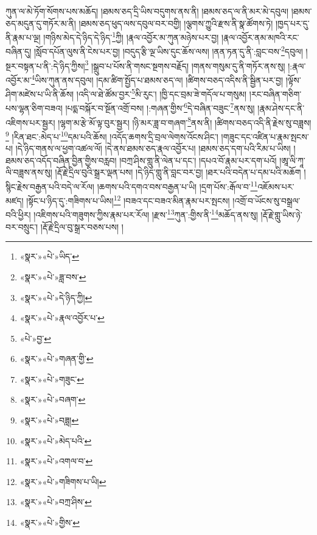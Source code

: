 ཀུན་ལ་མེ་ཏོག་སོགས་པས་མཆོད། །ཐམས་ཅད་དྲི་ཡིས་བདུགས་ནས་ནི། །ཐམས་ཅད་ལ་ནི་མར་མེ་དབུལ། །ཐམས་ཅད་མདུན་དུ་གཏོར་མ་ནི། །ཐམས་ཅད་ཕུད་ལས་དབུལ་བར་བགྱི། །ལྕགས་ཀྱུའི་རྫས་ནི་སྣ་ཚོགས་ཏེ། །ཁྱད་པར་དུ་ནི་རྣམ་པ་ལྔ། །གཉིས་མེད་དེ་ཉིད་དེ་ཉིད་\footnote{«སྣར་»«པེ་»ཡིད་}ཀྱི། །རྣལ་འབྱོར་མ་ཀུན་མཉེས་པར་བྱ། །རྣལ་འབྱོར་ནམ་མཁའི་རང་བཞིན་དུ། །སློབ་དཔོན་ལུས་ནི་ངེས་པར་བྱ། །བདུད་རྩི་ལྔ་ཡིས་དུང་ཆོས་ལས། །ནན་ཏན་དུ་ནི་:བླང་བས་\footnote{«སྣར་»«པེ་»ཟླ་བས་}དབུལ། །སྔར་བསྟན་པ་ནི་:དེ་ཉིད་ཀྱིས།\footnote{«སྣར་»«པེ་»དེ་ཉིད་ཀྱི།} །སྒྲུབ་པ་པོས་ནི་གསང་སྔགས་བརྗོད། །གནས་གསུམ་དུ་ནི་གཏོར་ནས་སུ། །:རྣལ་འབྱོར་མ་\footnote{«སྣར་»«པེ་»རྣལ་འབྱོར་པ་}ཡིས་ཀུན་ནས་དབུལ། །དམ་ཚིག་སྤྱོད་པ་ཐམས་ཅད་ལ། །ཚིགས་བཅད་འདིས་ནི་སྦྱིན་པར་བྱ། །ལྟོས་ཤིག་མཛེས་པ་ཡི་ནི་ཆོས། །འདི་ལ་ཐེ་ཚོམ་བྱར་\footnote{«པེ་»བྱ་}མི་རུང་། །ཁྱི་དང་བྲམ་ཟེ་གདོལ་པ་གསུམ། །རང་བཞིན་གཅིག་པས་ལྷན་ཅིག་བཟའ། །པདྨ་བསྐོར་བ་སྔོན་འགྲོ་བས། །:གཞན་གྱིས་\footnote{«སྣར་»«པེ་»གཞན་གྱི་}དེ་བཞིན་བཟུང་\footnote{«སྣར་»«པེ་»གཟུང་}ནས་སུ། །རྣམ་ཤེས་དང་ནི་འཇིགས་པར་སྦྱར། །ལྷག་མ་རྩེ་མོ་ལྟ་བུར་སྦྱར། །ཉི་མར་ཟླ་བ་གཞག་\footnote{«སྣར་»«པེ་»བཞག་}ནས་ནི། །ཚིགས་བཅད་འདི་ནི་རྗེས་སུ་བཟླས།\footnote{«སྣར་»«པེ་»བཟླ།} །རིན་ཐང་:མེད་པ་\footnote{«སྣར་»«པེ་»མེད་པའི་}དམ་པའི་ཆོས། །འདོད་ཆགས་དྲི་བྲལ་ལེགས་འོངས་ཤིང་། །གཟུང་དང་འཛིན་པ་རྣམ་སྤངས་པ། །དེ་ཉིད་གནས་ལ་ཕྱག་འཚལ་ལོ། །དེ་ནས་ཐམས་ཅད་རྣལ་འབྱོར་པ། །ཐམས་ཅད་དག་པའི་རིམ་པ་ཡིས། །ཐམས་ཅད་འདོད་བཞིན་བྱིན་གྱིས་བརླབ། །བཀྲ་ཤིས་གླུ་ནི་ལེན་པ་དང་། །དཔའ་བོ་རྣམ་པར་དག་པའོ། །ཨཱ་ལི་ཀཱ་ལི་བཟླས་ནས་སུ། །རྡོ་རྗེ་དྲིལ་བུའི་སྒྲར་ལྡན་པས། །དེ་ཉིད་གླུ་ནི་བླང་བར་བྱ། །ཐར་པའི་བདེན་པ་དམ་པའི་མཆོག །སྙིང་རྗེས་བརྒྱན་པའི་བདེ་ལ་རོལ། །ཆགས་པའི་དགའ་བས་བརྒྱན་པ་ཡི། །དྲག་པོས་:རྒོལ་བ་\footnote{«སྣར་»«པེ་»འགལ་བ་}འཇོམས་པར་མཛད། །སྟོང་པ་ཉིད་དུ་:གཟིགས་པ་ཡིས།\footnote{«སྣར་»«པེ་»གཟིགས་པ་ཡི།} །བཟའ་དང་བཟའ་མིན་རྣམ་པར་སྤངས། །འགྲོ་བ་ཡོངས་སུ་བསྒྲལ་བའི་ཕྱིར། །འཇིགས་པའི་གཟུགས་ཀྱིས་རྣམ་པར་རོལ། །རྫས་\footnote{«སྣར་»«པེ་»བཀྲ་ཤིས་}ཀུན་:གྱིས་ནི་\footnote{«སྣར་»«པེ་»གྱིས་}མཆོད་ནས་སུ། །རྡོ་རྗེ་གླུ་ཡིས་ཉེ་བར་བསྲུང་། །རྡོ་རྗེ་དྲིལ་བུ་སྒྲར་བཅས་པས། །
